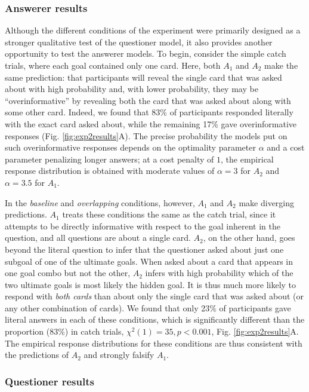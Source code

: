 \documentclass[11pt, floatsintext]{apa6}
\begin{document}
\subsubsection{Answerer results}

Although the different conditions of the experiment were primarily designed as a stronger qualitative test of the questioner model, it also provides another opportunity to test the answerer models. 
To begin, consider the simple catch trials, where each goal contained only one card.
Here, both $A_1$ and $A_2$ make the same prediction: that participants will reveal the single card that was asked about with high probability and, with lower probability, they may be ``overinformative'' by revealing both the card that was asked about along with some other card.
Indeed, we found that 83\% of participants responded literally with the exact card asked about, while the remaining 17\% gave overinformative responses (Fig. \ref{fig:exp2results}A).
The precise probability the models put on such overinformative responses depends on the optimality parameter $\alpha$ and a cost parameter penalizing longer answers; at a cost penalty of $1$, the empirical response distribution is obtained with moderate values of $\alpha=3$ for $A_2$ and $\alpha = 3.5$ for $A_1$.

In the \emph{baseline} and \emph{overlapping} conditions, however, $A_1$ and $A_2$ make diverging predictions. 
$A_1$ treats these conditions the same as the catch trial, since it attempts to be directly informative with respect to the goal inherent in the question, and all questions are about a single card.
$A_2$, on the other hand, goes beyond the literal question to infer that the questioner asked about just one subgoal of one of the ultimate goals.
When asked about a card that appears in one goal combo but not the other, $A_2$ infers with high probability which of the two ultimate goals is most likely the hidden goal. 
It is thus much more likely to respond with \emph{both cards} than about only the single card that was asked about (or any other combination of cards). 
We found that only 23\% of participants gave literal answers in each of these conditions, which is significantly different than the proportion (83\%) in catch trials, $\chi^2(1) = 35, p < 0.001$, Fig. \ref{fig:exp2results}A.
The empirical response distributions for these conditions are thus consistent with the predictions of $A_2$ and strongly falsify $A_1$.

\subsubsection{Questioner results}
\end{document}
